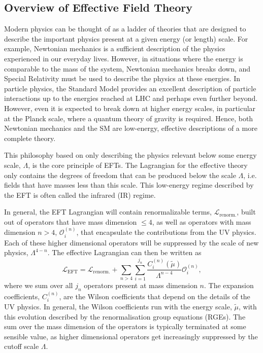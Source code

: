 \subsection{Overview of Effective Field Theory}
\label{ch1:subsec:EFT_intro}

Modern physics can be thought of as a ladder of theories that are designed to describe the important physics present at a given energy (or length) scale. For example, Newtonian mechanics is a sufficient description of the physics experienced in our everyday lives. However, in situations where the energy is comparable to the mass of the system, Newtonian mechanics breaks down, and Special Relativity must be used to describe the physics at these energies. In particle physics, the Standard Model provides an excellent description of particle interactions up to the energies reached at LHC and perhaps even further beyond. However, even it is expected to break down at higher energy scales, in particular at the Planck scale, where a quantum theory of gravity is required. Hence, both Newtonian mechanics and the SM are low-energy, effective descriptions of a more complete theory.

This philosophy based on only describing the physics relevant below some energy scale, $\Lambda$, is the core principle of EFTs. The Lagrangian for the effective theory only contains the degrees of freedom that can be produced below the scale $\Lambda$, i.e. fields that have masses less than this scale. This low-energy regime described by the EFT is often called the infrared (IR) regime. 

In general, the EFT Lagrangian will contain renormalizable terms, $\mathcal{L}_\mathrm{renorm.}$,  built out of operators that have mass dimension $\leq 4$, as well as operators with mass dimension $n> 4$, $\mathcal{O}_i^{(n)}$, that encapsulate the contributions from the UV physics. Each of these higher dimensional operators will be suppressed by the scale of new physics, $\Lambda^{4-n}$. 
The effective Lagrangian can then be written as
\begin{equation}
    \mathcal{L}_\mathrm{EFT} = \mathcal{L}_\mathrm{renorm.} +  \sum_{n>4}   \sum_{i = 1}^{j_n} \frac{C_i^{(n)} (\tilde{\mu})}{\Lambda^{n-4}}\mathcal{O}_i^{(n)},
    \label{ch1:eq:EFT_Lagrangian}
\end{equation}
where we sum over all $j_n$ operators present at mass dimension $n$. The expansion coefficients, $C_i^{(n)}$, are the Wilson coefficients that depend on the details of the UV physics. In general, the Wilson coefficients run with the energy scale, $\tilde{\mu}$, with this evolution described by the renormalisation group equations (RGEs).
The sum over the mass dimension of the operators is typically terminated at some sensible value, as higher dimensional operators get increasingly suppressed by the cutoff scale $\Lambda$.

